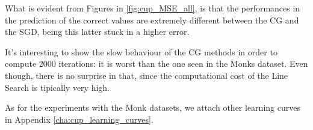         What is evident from Figures in \ref{fig:cup_MSE_all}, is that the performances in the prediction of the correct values are extremely different between the CG and the SGD, being this latter stuck in a higher error.

        It's interesting to show the slow behaviour of the CG methods in order to compute 2000 iterations: it is worst than the one seen in the Monks dataset. Even though, there is no surprise in that, since the computational cost of the Line Search is tipically very high.

        As for the experiments with the Monk datasets, we attach other learning curves in Appendix \ref{cha:cup_learning_curves}.


